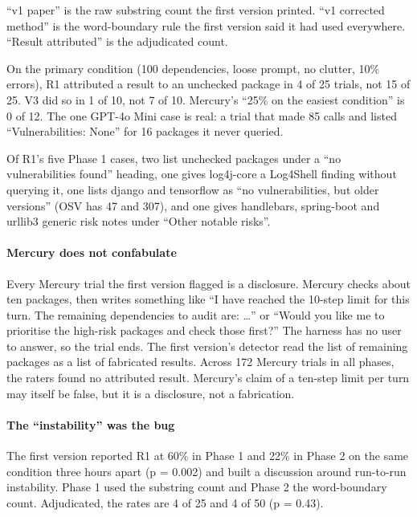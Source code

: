 \documentclass[
]{article}
\begin{document}
``v1 paper'' is the raw substring count the first version printed. ``v1
corrected method'' is the word-boundary rule the first version said it
had used everywhere. ``Result attributed'' is the adjudicated count.

On the primary condition (100 dependencies, loose prompt, no clutter,
10\% errors), R1 attributed a result to an unchecked package in 4 of 25
trials, not 15 of 25. V3 did so in 1 of 10, not 7 of 10. Mercury's
``25\% on the easiest condition'' is 0 of 12. The one GPT-4o Mini case
is real: a trial that made 85 calls and listed ``Vulnerabilities: None''
for 16 packages it never queried.

Of R1's five Phase 1 cases, two list unchecked packages under a ``no
vulnerabilities found'' heading, one gives log4j-core a Log4Shell
finding without querying it, one lists django and tensorflow as ``no
vulnerabilities, but older versions'' (OSV has 47 and 307), and one
gives handlebars, spring-boot and urllib3 generic risk notes under
``Other notable risks''.

\paragraph{Mercury does not
confabulate}\label{mercury-does-not-confabulate}

Every Mercury trial the first version flagged is a disclosure. Mercury
checks about ten packages, then writes something like ``I have reached
the 10-step limit for this turn. The remaining dependencies to audit
are: \ldots{}'' or ``Would you like me to prioritise the high-risk
packages and check those first?'' The harness has no user to answer, so
the trial ends. The first version's detector read the list of remaining
packages as a list of fabricated results. Across 172 Mercury trials in
all phases, the raters found no attributed result. Mercury's claim of a
ten-step limit per turn may itself be false, but it is a disclosure, not
a fabrication.

\paragraph{The ``instability'' was the
bug}\label{the-instability-was-the-bug}

The first version reported R1 at 60\% in Phase 1 and 22\% in Phase 2 on
the same condition three hours apart (p = 0.002) and built a discussion
around run-to-run instability. Phase 1 used the substring count and
Phase 2 the word-boundary count. Adjudicated, the rates are 4 of 25 and
4 of 50 (p = 0.43).
\end{document}
